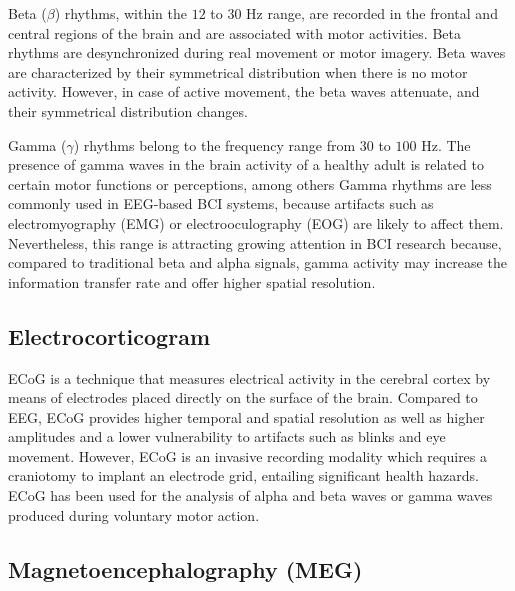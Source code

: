 Beta ($\beta$) rhythms, within the $12$ to $30$ Hz range, are recorded in the frontal and central regions of the brain and are associated with motor activities. Beta rhythms are desynchronized during real movement or motor imagery. Beta waves are characterized by their symmetrical distribution when there is no motor activity. However, in case of active movement, the beta waves attenuate, and their symmetrical distribution changes.

Gamma ($\gamma$) rhythms belong to the frequency range from $30$ to $100$ Hz. The presence of gamma waves in the brain activity of a healthy adult is related to certain motor functions or perceptions, among others Gamma rhythms are less commonly used in EEG-based BCI systems, because artifacts such as electromyography (EMG) or electrooculography (EOG) are likely to affect them. Nevertheless, this range is attracting growing attention in BCI research because, compared to traditional beta and alpha signals, gamma activity may increase the information transfer rate and offer higher spatial resolution.

\subsection{Electrocorticogram}\label{ch2:5}

ECoG is a technique that measures electrical activity in the cerebral cortex by means of electrodes placed directly on the surface of the brain. Compared to EEG, ECoG provides higher temporal and spatial resolution as well as higher amplitudes and a lower vulnerability to artifacts such as blinks and eye movement. However, ECoG is an invasive recording modality which requires a craniotomy to implant an electrode grid, entailing significant health hazards.  ECoG has been used for the analysis of alpha and beta waves or gamma waves produced during voluntary motor action.

\subsection{Magnetoencephalography (MEG)}\label{ch2:5}

